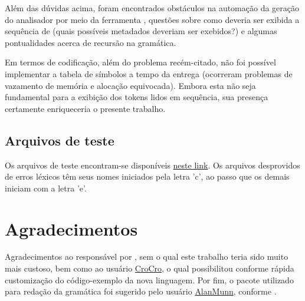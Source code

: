 \documentclass[
	article,			%
	11pt,				%
	oneside,			%
	a4paper,			%
	english,			%
	brazil,				%
	sumario=tradicional
	]{abntex2}
\begin{document}
Além das dúvidas acima, foram encontrados obstáculos na automação da geração do analisador por meio da ferramenta , questões sobre como deveria ser exibida a sequência de  (quais possíveis metadados deveriam ser exebidos?) e algumas pontualidades acerca de recursão na gramática.

Em termos de codificação, além do problema recém-citado, não foi possível implementar a tabela de símbolos a tempo da entrega (ocorreram problemas de vazamento de memória e alocação equivocada). Embora esta não seja fundamental para a exibição dos tokens lidos em sequência, sua presença certamente enriqueceria o presente trabalho.

\subsection{Arquivos de teste}
Os arquivos de teste encontram-se disponíveis \href{https://github.com/maffei2443/unb_tradutores/tree/master/trab/trab2/code/test}{neste link}. Os arquivos desprovidos de erros léxicos têm seus nomes iniciados pela letra 'c', ao passo que os demais iniciam com a letra 'e'.

\section{Agradecimentos}
Agradecimentos ao responsável por \cite{gramatica}, sem o qual este trabalho teria sido muito mais custoso, bem como ao usuário \hyperref{https://tex.stackexchange.com/users/42366/croco}{}{}{CroCro}, o qual possibilitou conforme \cite{custom} rápida customização do código-exemplo da nova linguagem. Por fim, o pacote utilizado para redação da gramática foi sugerido pelo usuário \hyperref{https://tex.stackexchange.com/questions/348651/c-code-to-add-in-the-document}{}{}{AlanMunn}, conforme \cite{bnf}.

% 

\postextual


\end{document}
